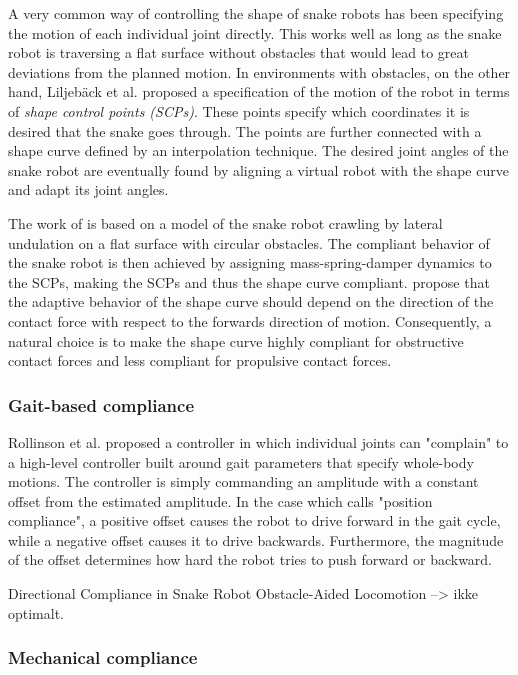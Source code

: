 A very common way of controlling the shape of snake robots has been specifying the motion of each individual joint directly. This works well as long as the snake robot is traversing a flat surface without obstacles that would lead to great deviations from the planned motion.
In environments with obstacles, on the other hand, Liljebäck et al. \cite{liljeback2014compliant} proposed a specification of the motion of the robot in terms of \textit{shape control points (SCPs)}. These points specify which coordinates it is desired that the snake goes through. The points are further connected with a shape curve defined by an interpolation technique. The desired joint angles of the snake robot are eventually found by aligning a virtual robot with the shape curve and adapt its joint angles.

The work of \cite{liljeback2014compliant} is based on a model of the snake robot crawling by lateral undulation on a flat surface with circular obstacles. The compliant behavior of the snake robot is then achieved by assigning mass-spring-damper dynamics to the SCPs, making the SCPs and thus the shape curve compliant. \cite{liljeback2014compliant} propose that the adaptive behavior of the shape curve should depend on the direction of the contact force with respect to the forwards direction of motion. Consequently, a natural choice is to make the shape curve highly compliant for obstructive contact forces and less compliant for propulsive contact forces.

\subsubsection{Gait-based compliance}

Rollinson et al. \cite{rollinson2013gait} proposed a controller in which individual joints can "complain" to a high-level controller built around gait parameters that specify whole-body motions. The controller is simply commanding an amplitude with a constant offset from the estimated amplitude. In the case which \cite{rollinson2013gait} calls "position compliance", a positive offset causes the robot to drive forward in the gait cycle, while a negative offset causes it to drive backwards. Furthermore, the magnitude of the offset determines how hard the robot tries to push forward or backward.

Directional Compliance in Snake Robot Obstacle-Aided Locomotion --> ikke optimalt.


\subsubsection{Mechanical compliance}

